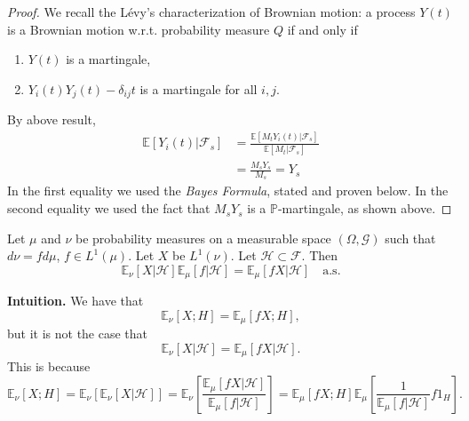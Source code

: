 \begin{proof}
    We recall the L\'evy's characterization of Brownian motion: a process $Y(t)$ is a Brownian motion w.r.t. probability measure $Q$ if and only if
    \begin{enumerate}
        \item $Y(t)$ is a martingale,
        \item $Y_i(t) Y_j(t) - \delta_{ij} t$ is a martingale for all $i, j$.
    \end{enumerate}
    By above result,
    \begin{align*}
        \mathbb{E}\left[ Y_i(t) | \mathcal{F}_s \right] 
	&= \frac{\mathbb{E}\left[ M_t Y_i(t) | \mathcal{F}_s \right] }{\mathbb{E}\left[ M_t | \mathcal{F}_s \right] } \\
	&= \frac{M_s Y_s}{ M_s} = Y_s
    \end{align*}
    In the first equality we used the \textit{Bayes Formula}, stated and proven below. In the second equality we used the fact that $M_s Y_s$ is a $\mathbb{P}$-martingale, as shown above.
\end{proof}

\begin{lemma}
	\label{lem:BayesRule}
	Let $\mu$ and $\nu$ be probability measures on a measurable space $(\Omega, \mathcal{G})$ such that $d\nu = f d \mu$, $f \in L^1(\mu)$. Let $X$ be $L^1(\nu)$. Let $\mathcal{H} \subset \mathcal{F}$. Then
	\[
		\mathbb{E}_\nu\left[ X | \mathcal{H} \right] 
		\mathbb{E}_\mu \left[ f | \mathcal{H} \right] 
		= \mathbb{E}_\mu \left[ f X | \mathcal{H} \right] 
		\quad \text{a.s.}
	\] 
\end{lemma}

\textbf{Intuition.} We have that
\[
    \mathbb{E}_\nu\left[ X ; H \right]
    = \mathbb{E}_\mu\left[ f X ; H \right]
    ,
\]
but it is not the case that
\[
    \mathbb{E}_\nu\left[ X | \mathcal{H} \right]
    = \mathbb{E}_\mu\left[ f X | \mathcal{H} \right]
    .
\]
This is because
\[
	\mathbb{E}_\nu \left[ X ;H \right] 
	= \mathbb{E}_\nu \left[ \mathbb{E}_\nu[X | \mathcal{H}] \right] 
	= \mathbb{E}_\nu \left[ \frac{\mathbb{E}_\mu\left[ f X | \mathcal{H} \right] }{\mathbb{E}_\mu \left[ f | \mathcal{H}  \right] } \right] 
	= \mathbb{E}_\mu\left[ f X ;H \right] \mathbb{E}_\mu \left[ \frac{ 1 }{\mathbb{E}_\mu \left[ f | \mathcal{H}  \right] } f 1_H \right] 
.\] 

